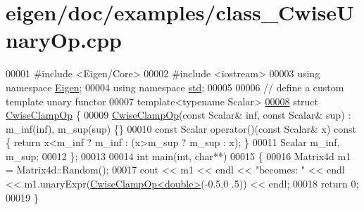 \hypertarget{eigen_2doc_2examples_2class___cwise_unary_op_8cpp_source}{}\section{eigen/doc/examples/class\+\_\+\+Cwise\+Unary\+Op.cpp}
\label{eigen_2doc_2examples_2class___cwise_unary_op_8cpp_source}

\begin{DoxyCode}
00001 \textcolor{preprocessor}{#include <Eigen/Core>}
00002 \textcolor{preprocessor}{#include <iostream>}
00003 \textcolor{keyword}{using namespace }\hyperlink{namespace_eigen}{Eigen};
00004 \textcolor{keyword}{using namespace }\hyperlink{namespacestd}{std};
00005 
00006 \textcolor{comment}{// define a custom template unary functor}
00007 \textcolor{keyword}{template}<\textcolor{keyword}{typename} Scalar>
\hyperlink{struct_cwise_clamp_op}{00008} \textcolor{keyword}{struct }\hyperlink{struct_cwise_clamp_op}{CwiseClampOp} \{
00009   \hyperlink{struct_cwise_clamp_op}{CwiseClampOp}(\textcolor{keyword}{const} Scalar& inf, \textcolor{keyword}{const} Scalar& sup) : m\_inf(inf), m\_sup(sup) \{\}
00010   \textcolor{keyword}{const} Scalar operator()(\textcolor{keyword}{const} Scalar& x)\textcolor{keyword}{ const }\{ \textcolor{keywordflow}{return} x<m\_inf ? m\_inf : (x>m\_sup ? m\_sup : x); \}
00011   Scalar m\_inf, m\_sup;
00012 \};
00013 
00014 \textcolor{keywordtype}{int} main(\textcolor{keywordtype}{int}, \textcolor{keywordtype}{char}**)
00015 \{
00016   Matrix4d m1 = Matrix4d::Random();
00017   cout << m1 << endl << \textcolor{stringliteral}{"becomes: "} << endl << m1.unaryExpr(\hyperlink{struct_cwise_clamp_op}{CwiseClampOp<double>}(-0.5,0
      .5)) << endl;
00018   \textcolor{keywordflow}{return} 0;
00019 \}
\end{DoxyCode}
